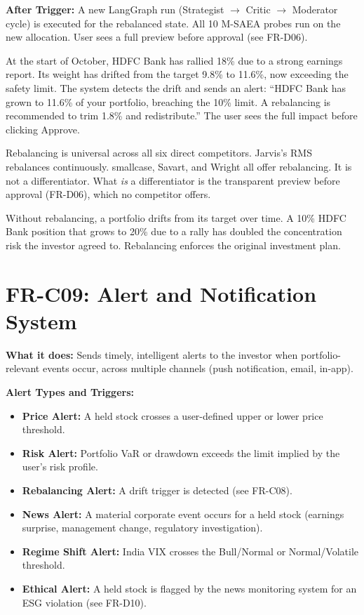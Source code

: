 \documentclass[12pt, a4paper, openany, oneside]{report}
\begin{document}
\textbf{After Trigger:} A new LangGraph run (Strategist $\rightarrow$ Critic $\rightarrow$ Moderator cycle) is executed for the rebalanced state. All 10 M-SAEA probes run on the new allocation. User sees a full preview before approval (see FR-D06).

\begin{examplebox}
At the start of October, HDFC Bank has rallied 18\% due to a strong earnings report. Its weight has drifted from the target 9.8\% to 11.6\%, now exceeding the safety limit. The system detects the drift and sends an alert: ``HDFC Bank has grown to 11.6\% of your portfolio, breaching the 10\% limit. A rebalancing is recommended to trim 1.8\% and redistribute.'' The user sees the full impact before clicking Approve.
\end{examplebox}

\begin{gapbox}
Rebalancing is universal across all six direct competitors. Jarvis's RMS rebalances continuously. smallcase, Savart, and Wright all offer rebalancing. It is not a differentiator. What \textit{is} a differentiator is the transparent preview before approval (FR-D06), which no competitor offers.
\end{gapbox}

\begin{valuebox}
Without rebalancing, a portfolio drifts from its target over time. A 10\% HDFC Bank position that grows to 20\% due to a rally has doubled the concentration risk the investor agreed to. Rebalancing enforces the original investment plan.
\end{valuebox}

\section{FR-C09: Alert and Notification System}

\textbf{What it does:} Sends timely, intelligent alerts to the investor when portfolio-relevant events occur, across multiple channels (push notification, email, in-app).

\textbf{Alert Types and Triggers:}
\begin{itemize}
  \item \textbf{Price Alert:} A held stock crosses a user-defined upper or lower price threshold.
  \item \textbf{Risk Alert:} Portfolio VaR or drawdown exceeds the limit implied by the user's risk profile.
  \item \textbf{Rebalancing Alert:} A drift trigger is detected (see FR-C08).
  \item \textbf{News Alert:} A material corporate event occurs for a held stock (earnings surprise, management change, regulatory investigation).
  \item \textbf{Regime Shift Alert:} India VIX crosses the Bull/Normal or Normal/Volatile threshold.
  \item \textbf{Ethical Alert:} A held stock is flagged by the news monitoring system for an ESG violation (see FR-D10).
\end{itemize}
\end{document}
